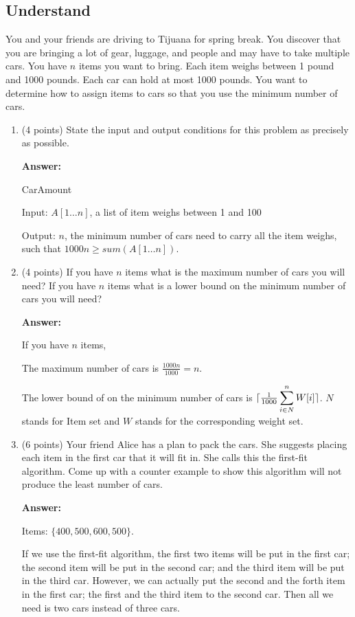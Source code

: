 \documentclass[paper=a4, fontsize=11pt]{scrartcl}
\DeclarePairedDelimiter\ceil{\lceil}{\rceil}
\numberwithin{equation}{section}		%
\numberwithin{figure}{section}			%
\numberwithin{table}{section}				%
\begin{document}
\subsection{Understand}
You and your friends are driving to Tijuana for spring break.  You discover that you are bringing a lot of gear, luggage, and people and may have to take multiple cars.  You have $n$ items you want to bring.  Each item weighs between 1 pound and 1000 pounds.  Each car can hold at most 1000 pounds.  You want to determine how to assign items to cars so that you use the minimum number of cars.
\begin{enumerate}
\item (4 points) State the input and output conditions for this problem as precisely as possible.

\textbf{Answer:}

CarAmount

Input: $A[1 \dots n]$, a list of item weighs between 1 and 100

Output: $n$, the minimum number of cars need to carry all the item weighs, such that $1000n \geq sum(A[1\dots n])$.


\item (4 points) If you have $n$ items what is the maximum number of cars you will need?  If you have $n$ items what is a lower bound on the minimum number of cars you will need?

\textbf{Answer:}

If you have $n$ items,

The maximum number of cars is $\frac{1000n}{1000} = n$.

The lower bound of on the minimum number of cars is $\ceil{\frac{1}{1000} \displaystyle\sum_{i\in N}^n W[i]}$. $N$ stands for Item set and $W$ stands for the corresponding weight set.


\item (6 points) Your friend Alice has a plan to pack the cars.  She suggests placing each item in the first car that it will fit in.  She calls this the first-fit algorithm.  Come up with a counter example to show this algorithm will not produce the least number of cars.

\textbf{Answer:}

Items: $\{400,500,600,500\}$.

If we use the first-fit algorithm, the first two items will be put in the first car; the second item will be put in the second car; and the third item will be put in the third car. However, we can actually put the second and the forth item in the first car; the first and the third item to the second car. Then all we need is two cars instead of three cars.




\end{enumerate}
\end{document}
